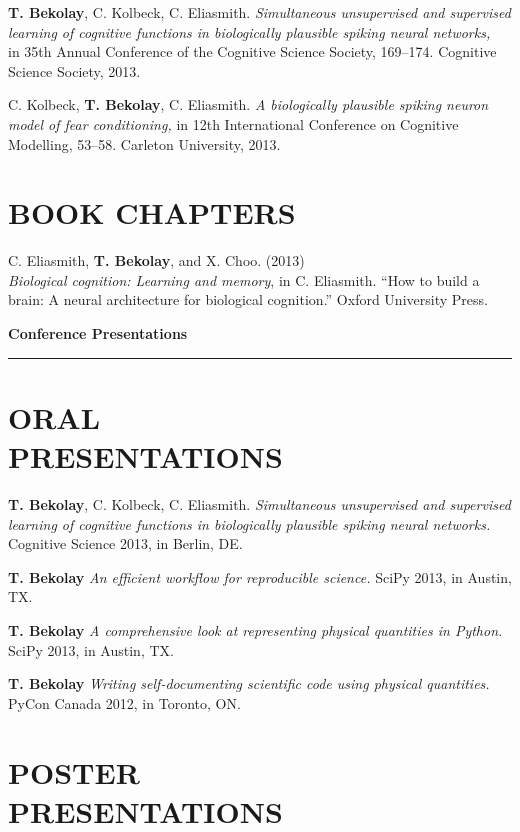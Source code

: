 \documentclass[line,margin]{res}
\begin{document}
\begin{resume}
\textbf{T. Bekolay}, C. Kolbeck, C. Eliasmith. {\sl Simultaneous
  unsupervised and supervised learning of cognitive functions
  in biologically plausible spiking neural networks,} \\ in 35th Annual
  Conference of the Cognitive Science Society, 169--174.
  Cognitive Science Society, 2013.

C. Kolbeck, \textbf{T. Bekolay}, C. Eliasmith. {\sl A biologically
  plausible spiking neuron model of fear conditioning,} in 12th International
  Conference on Cognitive Modelling, 53--58.
  Carleton University, 2013.

\section{BOOK CHAPTERS}

C. Eliasmith, \textbf{T. Bekolay}, and X. Choo. (2013) \\
  {\sl Biological cognition: Learning and memory}, in C. Eliasmith.
  ``How to build a brain: A neural architecture for biological cognition.''
  Oxford University Press. \vspace{0.42em}

{\Large \bf Conference Presentations} \\ \vspace{-8pt} \hrule

\section{ORAL \\PRESENTATIONS}

\textbf{T. Bekolay}, C. Kolbeck, C. Eliasmith.
  {\sl Simultaneous unsupervised and supervised learning of cognitive
  functions in biologically plausible spiking neural networks.} \\
  Cognitive Science 2013, in Berlin, DE.

\textbf{T. Bekolay} {\sl An efficient workflow for reproducible science.}
  SciPy 2013, in Austin, TX.

\textbf{T. Bekolay}
  {\sl A comprehensive look at representing physical quantities in Python.}
  SciPy 2013, in Austin, TX.

\textbf{T. Bekolay}
  {\sl Writing self-documenting scientific code using physical quantities.}
  PyCon Canada 2012, in Toronto, ON.

\section{POSTER \\PRESENTATIONS}


\end{resume}
\end{document}
